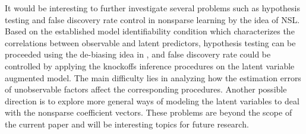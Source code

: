 \documentclass{statsoc}
\begin{document}
It would be interesting to further investigate several problems such as hypothesis testing and false discovery rate control in nonsparse learning by the idea of NSL. Based on the established model identifiability condition which characterizes the correlations between observable and latent predictors, hypothesis testing can be proceeded using the de-biasing idea in \cite{Java14, Geer14, Zhang2014}, and false discovery rate could be controlled by applying the knockoffs inference procedures \citep{Barber15, Candes16, Fan17} on the latent variable augmented model. The main difficulty lies in analyzing how the estimation errors of unobservable factors affect the corresponding procedures. Another possible direction is to explore more general ways of modeling the latent variables to deal with the nonsparse coefficient vectors. These problems are beyond the scope of the current paper and will be interesting topics for future research.


\appendix

%
%
\end{document}
